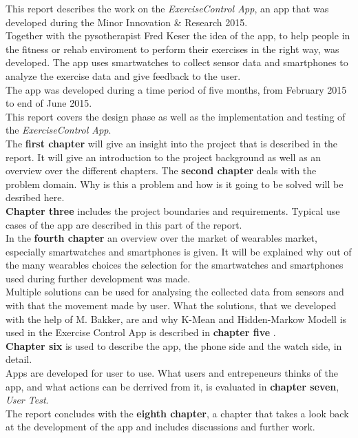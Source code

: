 This report describes the work on the \emph{ExerciseControl App}, an app that was developed during the Minor Innovation \& Research 2015.\\
Together with the pysotherapist Fred Keser the idea of the app, to help people in the fitness or rehab enviroment to perform their exercises in the right way, was developed. The app uses smartwatches to collect sensor data and smartphones to analyze the exercise data and give feedback to the user. \\
The app was developed during a time period of five months, from February 2015 to end of June 2015. \\
This report covers the design phase as well as the implementation and testing of the \emph{ExerciseControl App}.\\
The \textbf{first chapter} will give an insight into the project that is described in the report. It will give an introduction to the project background as well as an overview over the different chapters.
The \textbf{second chapter} deals with the problem domain. Why is this a problem and how is it going to be solved will be desribed here.\\
\textbf{Chapter three} includes the project boundaries and requirements. Typical use cases of the app are described in this part of the report.
\\
In the \textbf{fourth chapter} an overview over the market of wearables market, especially smartwatches and smartphones is given. It will be explained why out of the many wearables choices the selection for the smartwatches and smartphones used during further development was made.
\\
 Multiple solutions can be used for analysing the collected data from sensors and with that the movement made by user. What the solutions, that we developed with the help of M. Bakker, are and why K-Mean and Hidden-Markow Modell is used in the Exercise Control App is described in \textbf{chapter five} .
\\
\textbf{Chapter six} is used to describe the app, the phone side and the watch side, in detail.
\\
Apps are developed for user to use. What users and entrepeneurs thinks of the app, and what actions can be derrived from it, is evaluated in \textbf{chapter seven}, \emph{User Test}.
\\
The report concludes with the \textbf{eighth chapter}, a chapter that takes a look back at the development of the app and includes discussions and further work.
